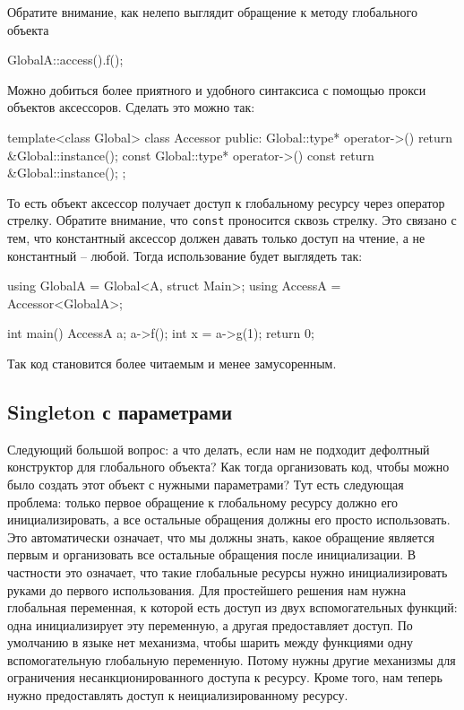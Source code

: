 Обратите внимание, как нелепо выглядит обращение к методу глобального объекта
\begin{cppcode}
GlobalA::access().f();
\end{cppcode}
Можно добиться более приятного и удобного синтаксиса с помощью прокси объектов аксессоров.
Сделать это можно так:
\begin{cppcode}
template<class Global>
class Accessor {
public:
  Global::type* operator->() {
    return &Global::instance();
  }
  const Global::type* operator->() const {
    return &Global::instance();
  }
};
\end{cppcode}
То есть объект аксессор получает доступ к глобальному ресурсу через оператор стрелку.
Обратите внимание, что \verb"const" проносится сквозь стрелку.
Это связано с тем, что константный аксессор должен давать только доступ на чтение, а не константный -- любой.
Тогда использование будет выглядеть так:
\begin{cppcode}
using GlobalA = Global<A, struct Main>;
using AccessA = Accessor<GlobalA>;

int main() {
  AccessA a;
  a->f();
  int x = a->g(1);
  return 0;
}
\end{cppcode}
Так код становится более читаемым и менее замусоренным.

\subsection{Singleton с параметрами}
\label{section::SingletonParams}

Следующий большой вопрос: а что делать, если нам не подходит дефолтный конструктор для глобального объекта?
Как тогда организовать код, чтобы можно было создать этот объект с нужными параметрами?
Тут есть следующая проблема: только первое обращение к глобальному ресурсу должно его инициализировать, а все остальные обращения должны его просто использовать.
Это автоматически означает, что мы должны знать, какое обращение является первым и организовать все остальные обращения после инициализации.
В частности это означает, что такие глобальные ресурсы нужно инициализировать руками до первого использования.
Для простейшего решения нам нужна глобальная переменная, к которой есть доступ из двух вспомогательных функций: одна инициализирует эту переменную, а другая предоставляет доступ.
По умолчанию в языке нет механизма, чтобы шарить между функциями одну вспомогательную глобальную переменную.
Потому нужны другие механизмы для ограничения несанкционированного доступа к ресурсу.
Кроме того, нам теперь нужно предоставлять доступ к неициализированному ресурсу.

